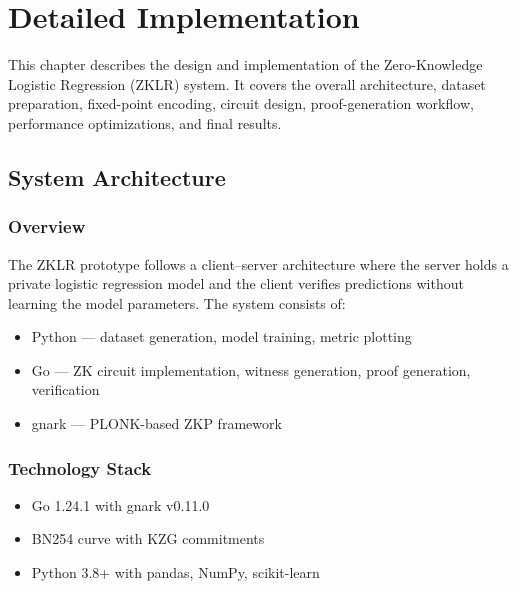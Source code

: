 \chapter{Detailed Implementation}\label{chap:detailed-implementation}

This chapter describes the design and implementation of the Zero-Knowledge Logistic Regression (ZKLR) system. It covers the overall architecture, dataset preparation, fixed-point encoding, circuit design, proof-generation workflow, performance optimizations, and final results.

\section{System Architecture}\label{sec:system-architecture}

\subsection{Overview}
The ZKLR prototype follows a client–server architecture where the server holds a private logistic regression model and the client verifies predictions without learning the model parameters. The system consists of:

\begin{itemize}
    \item Python — dataset generation, model training, metric plotting
    \item Go — ZK circuit implementation, witness generation, proof generation, verification
    \item gnark — PLONK-based ZKP framework
\end{itemize}

\subsection{Technology Stack}
\begin{itemize}
    \item Go 1.24.1 with gnark v0.11.0
    \item BN254 curve with KZG commitments
    \item Python 3.8+ with pandas, NumPy, scikit-learn
\end{itemize}

